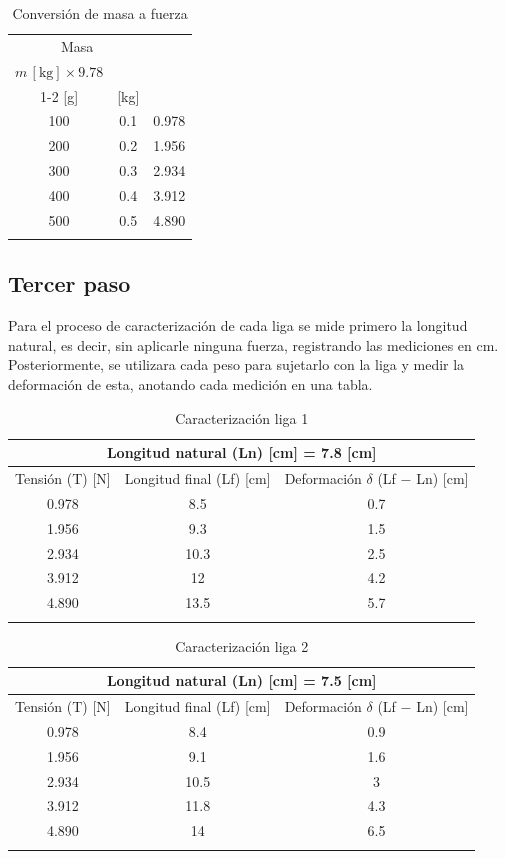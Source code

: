\documentclass[12pt, titlepage]{report}
\newcommand{\unit}[1]{\ensuremath{\, \mathrm{#1}}}
\begin{document}
    \begin{longtable}{|c|c|c|}
        \hline
        \multicolumn{2}{|c|}{Masa} & \multirowcell{2}{Tensión \unit{[N]} \\ $m \unit{[kg]} \times 9.78 $} \\ \cline{1-2}
        [g] & [kg] & ~ \\ \hline
        100 & 0.1 & 0.978 \\ \hline
        200 & 0.2 & 1.956 \\ \hline
        300 & 0.3 & 2.934 \\ \hline
        400 & 0.4 & 3.912 \\ \hline
        500 & 0.5 & 4.890 \\ \hline
        \caption{Conversión de masa a fuerza}
    \end{longtable} 

    \subsection*{Tercer paso}
    Para el proceso de caracterización de cada liga se mide primero la longitud natural, es decir, sin aplicarle ninguna fuerza, registrando las mediciones en cm. Posteriormente, se utilizara cada peso para sujetarlo con la liga y medir la deformación de esta, anotando cada medición en una tabla.

    \begin{longtable}{|c|c|c|}
        \hline
        \multicolumn{3}{|c|}{Longitud natural (Ln) [cm] = 7.8 [cm]} \\ \hline
        Tensión (T) [N] & Longitud final (Lf) [cm] & Deformación $\delta$  (Lf $-$ Ln) [cm] \\ \hline
        0.978 & 8.5 & 0.7 \\ \hline
        1.956 & 9.3 & 1.5 \\ \hline
        2.934 & 10.3 & 2.5 \\ \hline
        3.912 & 12 & 4.2 \\ \hline
        4.890 & 13.5 & 5.7 \\ \hline
        \caption{Caracterización liga 1}
    \end{longtable}

    \begin{longtable}{|c|c|c|}
        \hline
        \multicolumn{3}{|c|}{Longitud natural (Ln) [cm] = 7.5 [cm]} \\ \hline
        Tensión (T) [N] & Longitud final (Lf) [cm] & Deformación $\delta$  (Lf $-$ Ln) [cm] \\ \hline
        0.978 & 8.4 & 0.9 \\ \hline
        1.956 & 9.1 & 1.6 \\ \hline
        2.934 & 10.5 & 3\\ \hline
        3.912 & 11.8 & 4.3 \\ \hline
        4.890 & 14 & 6.5 \\ \hline
        \caption{Caracterización liga 2}
    \end{longtable}
\end{document}

